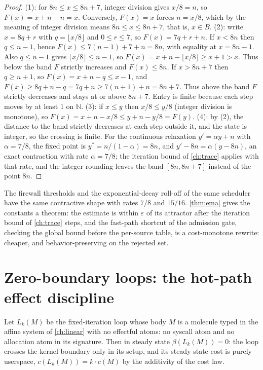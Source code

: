 \begin{proof}
(1): for $8n \leq x \leq 8n+7$, integer division gives $x/8 = n$, so
$F (x) = x + n - n = x$. Conversely, $F (x) = x$ forces $n = x/8$,
which by the meaning of integer division means $8n \leq x \leq 8n+7$,
that is, $x \in B$.
(2): write $x = 8q + r$ with $q = \lfloor x/8 \rfloor$ and
$0 \leq r \leq 7$, so $F (x) = 7q + r + n$. If $x < 8n$ then
$q \leq n-1$, hence $F (x) \leq 7(n-1) + 7 + n = 8n$, with equality at
$x = 8n-1$. Also $q \leq n-1$ gives $\lfloor x/8 \rfloor \leq n-1$, so
$F (x) = x + n - \lfloor x/8 \rfloor \geq x + 1 > x$. Thus below the
band $F$ strictly increases and $F (x) \leq 8n$. If $x > 8n+7$ then
$q \geq n+1$, so $F (x) = x + n - q \leq x - 1$, and
$F (x) \geq 8q + n - q = 7q + n \geq 7(n+1) + n = 8n+7$. Thus above
the band $F$ strictly decreases and stays at or above $8n+7$. Entry is
finite because each step moves by at least $1$ on $\mathbb{N}$.
(3): if $x \leq y$ then $x/8 \leq y/8$ (integer division is monotone),
so $F (x) = x + n - x/8 \leq y + n - y/8 = F (y)$.
(4): by (2), the distance to the band strictly decreases at each step
outside it, and the state is integer, so the crossing is finite. For
the continuous relaxation $y' = \alpha y + n$ with $\alpha = 7/8$, the
fixed point is $y^{*} = n/(1-\alpha) = 8n$, and
$y' - 8n = \alpha (y - 8n)$, an exact contraction with rate
$\alpha = 7/8$; the iteration bound of \autoref{ch:trace} applies with
that rate, and the integer rounding leaves the band $[8n, 8n+7]$
instead of the point $8n$.
\end{proof}

\begin{remark}
The firewall thresholds and the exponential-decay roll-off of the
same scheduler have the same contractive shape with rates $7/8$ and
$15/16$. \autoref{thm:ema} gives the constants a theorem: the estimate
is within $\varepsilon$ of its attractor after the iteration bound of
\autoref{ch:trace} steps, and the fast-path shortcut of the admission
gate, checking the global bound before the per-source table, is a
cost-monotone rewrite: cheaper, and behavior-preserving on the
rejected set.
\end{remark}

\section{Zero-boundary loops: the hot-path effect discipline}\label{sec:zero-boundary}

\begin{theorem}\label{thm:63}\label{thm:zero-boundary}
Let $L_k (M)$ be the fixed-iteration loop whose body $M$ is a molecule
typed in the affine system of \autoref{ch:linear} with no effectful
atoms: no syscall atom and no allocation atom in its signature. Then
in steady state $\beta (L_k (M)) = 0$: the loop crosses the kernel
boundary only in its setup, and its steady-state cost is purely
userspace, $c (L_k (M)) = k \cdot c (M)$ by the additivity of the cost
law.
\end{theorem}

